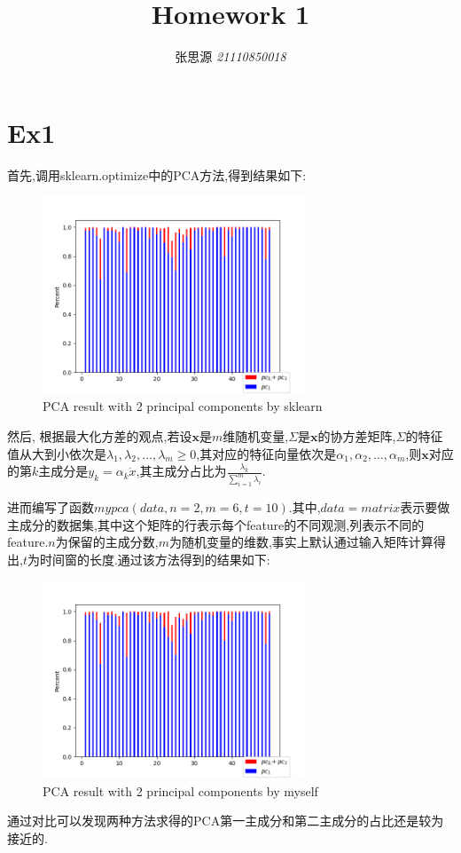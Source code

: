 \documentclass[UTF8,a4paper,11pt]{ctexart}
\title{\textbf{Homework 1}}
\author{ 张思源  \qquad  \textit{21110850018} }   %
\begin{document}
\maketitle
\section{Ex1}
\par 首先,调用sklearn.optimize中的PCA方法,得到结果如下:
\begin{figure}[htbp]
	\centering
	\includegraphics[width=0.7\textwidth,height=0.5\textwidth]{pca1.png}
	\caption{PCA result with 2 principal components by sklearn}
\end{figure}
\par 然后, 根据最大化方差的观点,若设$\mathbf{x}$是$m$维随机变量,$\Sigma$是$\mathbf{x}$的协方差矩阵,$\Sigma$的特征值从大到小依次是$\lambda_{1},\lambda_{2},\dots,\lambda_{m}\ge0$,其对应的特征向量依次是$\alpha_{1},\alpha_{2},\dots,\alpha_{m}$,则$\mathbf{x}$对应的第$k$主成分是$y_{k}=\alpha_{k}\dot x$,其主成分占比为$\frac{\lambda_{k}}{\sum_{i=1}^{m}\lambda_{i}}$.
\par 进而编写了函数$mypca(data,n=2,m=6,t=10)$.其中,$data=matrix$表示要做主成分的数据集,其中这个矩阵的行表示每个feature的不同观测,列表示不同的feature.$n$为保留的主成分数,$m$为随机变量的维数,事实上默认通过输入矩阵计算得出,$t$为时间窗的长度.通过该方法得到的结果如下:
\begin{figure}[H]
	\centering
	\includegraphics[width=0.7\textwidth,height=0.5\textwidth]{pca2.png}
	\caption{PCA result with 2 principal components by myself}
\end{figure}
\par 通过对比可以发现两种方法求得的PCA第一主成分和第二主成分的占比还是较为接近的.
\end{document}
